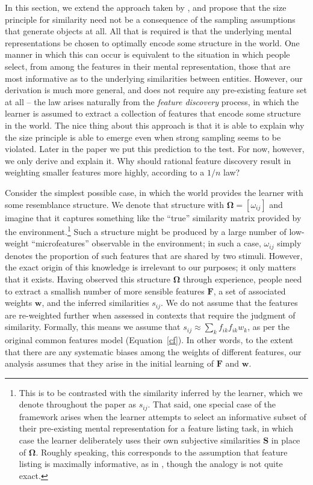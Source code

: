 \documentclass{apa}
\newcommand{\mat}[1]{\mathbf{#1}}
\newcommand{\vct}[1]{\mathbf{#1}}
\begin{document}
In this section, we extend the approach taken by , and propose that the size principle for similarity need not be a consequence of the sampling assumptions that generate objects at all. All that is required is that the underlying mental representations be chosen to optimally encode some structure in the world. One manner in which this can occur is equivalent to the  situation in which people select, from among the features in their mental representation, those that are most informative as to the underlying similarities between entities. However, our derivation is much more general, and does not require any pre-existing feature set at all -- the law arises naturally from the {\it feature discovery} process, in which the learner is assumed to extract a collection of features that encode some structure in the world. The nice thing about this approach is that it is able to explain why the size principle is able to emerge even when strong sampling seems to be violated. Later in the paper we put this prediction to the test. For now, however, we only derive and explain it. Why should rational feature discovery result in weighting smaller features more highly, according to a $1/n$ law?

Consider the simplest possible case, in which the world provides the learner with some resemblance structure. We denote that structure with $\mathbf{\Omega}=[\omega_{ij}]$ and imagine that it captures something like the ``true'' similarity matrix provided by the environment.\footnote{This is to be contrasted with the similarity inferred by the learner, which we denote throughout the paper as $s_{ij}$. That said, one special case of the framework arises when the learner attempts to select an informative subset of their pre-existing mental representation for a feature listing task, in which case the learner deliberately uses their own subjective similarities $\mathbf{S}$ in place of $\mathbf{\Omega}$. Roughly speaking, this corresponds to the assumption that feature listing is maximally informative, as in , though the analogy is not quite exact.} Such a structure might be produced by a  large number of low-weight ``microfeatures'' observable in the environment; in such a case, $\omega_{ij}$ simply denotes the proportion of such features that are shared by two stimuli. However, the exact origin of this knowledge is irrelevant to our purposes; it only matters that it exists. Having observed this structure $\mathbf{\Omega}$ through experience, people need to extract a smallish number of more sensible features $\mat{F}$, a set of associated weights $\vct{w}$, and the inferred similarities $s_{ij}$. We do not assume that the features are re-weighted further when assessed in contexts that require the judgment of similarity. Formally, this means we assume that $s_{ij} \approx \sum_k f_{ik} f_{ik} w_k$, as per the original common features model (Equation~\ref{cf}). In other words, to the extent that there are any systematic biases among the weights of different features, our analysis assumes that they arise in the initial learning of $\mat{F}$ and $\vct{w}$.
\end{document}
